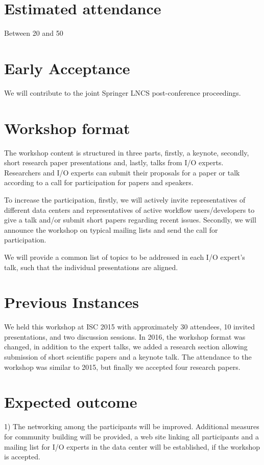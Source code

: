 \documentclass[a4paper,10pt]{article}
\begin{document}
\section{Estimated attendance}
Between 20 and 50

\section{Early Acceptance}

We will contribute to the joint Springer LNCS post-conference proceedings.




\section{Workshop format}
The workshop content is structured in three parts,
firstly, a keynote, secondly, short research paper presentations and, lastly, talks from I/O experts.
Researchers and I/O experts can submit their proposals for a paper or talk according to a call for participation for papers and speakers.

To increase the participation, firstly, we will actively invite representatives of different data centers and representatives of active workflow users/developers to give a talk and/or submit short papers regarding recent issues.
Secondly, we will announce the workshop on typical mailing lists and send the call for participation.

We will provide a common list of topics to be addressed in each I/O expert's talk, such that the individual presentations are aligned.


\section{Previous Instances}
We held this workshop at ISC 2015 with approximately 30 attendees, 10 invited presentations, and two discussion sessions. 
In 2016, the workshop format was changed, in addition to the expert talks, we added a research section allowing submission of short scientific papers and a keynote talk. 
The attendance to the workshop was similar to 2015, but finally we accepted four research papers.


\section{Expected outcome}
1) The networking among the participants will be improved.
Additional measures for community building will be provided, a web site linking all participants and a mailing list for I/O experts in the data center will be established, if the workshop is accepted.
\end{document}
